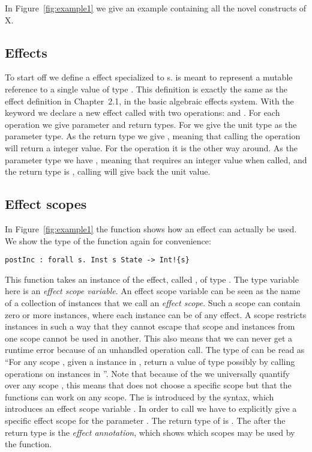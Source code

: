 In Figure~\ref{fig:example1} we give an example containing all the novel constructs of X.

\subsection{Effects}

To start off we define a  effect specialized to s.
 is meant to represent a mutable reference to a single value of type .
This definition is exactly the same as the  effect definition in Chapter~2.1, in the basic algebraic effects system.
With the  keyword we declare a new effect called  with two operations:  and .
For each operation we give parameter and return types. For  we give the unit type \ident{()} as the parameter type.
As the return type we give , meaning that calling the  operation will return a integer value.
For the  operation it is the other way around.
As the parameter type we have , meaning that  requires an integer value when called, and the return type is \ident{()}, calling  will give back the unit value.

\subsection{Effect scopes}
In Figure~\ref{fig:example1} the function  shows how an effect can actually be used.
We show the type of the function again for convenience:

\begin{verbatim}
postInc : forall s. Inst s State -> Int!{s}
\end{verbatim}

This function takes an instance of the  effect, called , of type .
The type variable  here is an \emph{effect scope variable}.
An effect scope variable can be seen as the name of a collection of instances that we call an \emph{effect scope}.
Such a scope can contain zero or more instances, where each instance can be of any effect.
A scope restricts instances in such a way that they cannot escape that scope and instances from one scope cannot be used in another.
This also means that we can never get a runtime error because of an unhandled operation call.
The type of  can be read as ``For any scope , given a  instance in , return a value of type  possibly by calling operations on instances in ''.
Note that because of the  we universally quantify over any scope , this means that  does not choose a specific scope but that the functions can work on any scope.
The  is introduced by the \ident{[s]} syntax, which introduces an effect scope variable .
In order to call  we have to explicitly give a specific effect scope for the parameter .
The return type of  is .
The  after the return type is the \emph{effect annotation}, which shows which scopes may be used by the function.

